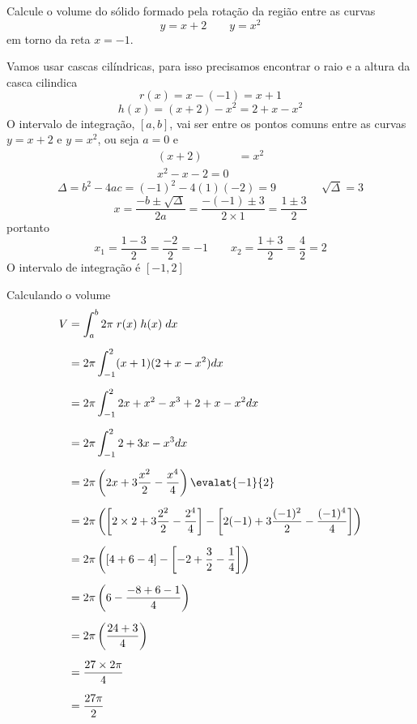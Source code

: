 \documentclass[a4paper,12pt,fleqn]{article}
\begin{document}

Calcule o volume do sólido formado pela rotação da região entre as curvas
\[
y = x+2 \qquad
y = x^2
\]
em torno da reta \(x=-1\).

\begin{answer}
  Vamos usar cascas cilíndricas, para isso precisamos encontrar o raio e a
  altura da casca cilindica
  \[
  r(x) = x - (-1) = x + 1
  \]
  \[
  h(x) = (x + 2) - x^2 = 2 + x - x^2
  \]
  O intervalo de integração, \([a, b]\), vai ser entre os pontos
  comuns entre as curvas \(y=x+2\) e \(y=x^2\),
  ou seja \(a=0\) e
  \begin{align*}
    (x + 2) & = x^2 \\
    x^2 - x - 2 = 0
  \end{align*}
  \[
  \Delta
  = b^2-4ac
  = (-1)^2 - 4(1)(-2)
  = 9
  \qquad\qquad
  \sqrt{\Delta} = 3
  \]
  \[
  x
  = \frac{-b\pm\sqrt{\Delta}}{2a}
  = \frac{-(-1)\pm 3}{2\times 1}
  = \frac{1\pm 3}{2}
  \]
  portanto
  \[
  x_1 = \frac{1-3}{2} = \frac{-2}{2} = -1
  \qquad
  x_2 = \frac{1+3}{2} = \frac{4}{2} = 2
  \]
  O intervalo de integração é \([-1, 2]\)

  \vspace{\baselineskip}
  Calculando o volume
  \begin{align*}
    V
    & = \int_a^b 2\pi \;r(x) \;h(x)\; dx  \\[2mm]
    & = 2\pi \int_{-1}^2 (x + 1) (2 + x - x^2) dx  \\[2mm]
    & = 2\pi \int_{-1}^2 2x + x^2 - x^3 + 2 + x - x^2  dx \\[2mm]
    & = 2\pi \int_{-1}^2 2 + 3x -x^3 dx \\[2mm]
    & = 2\pi \left(2x + 3\frac{x^2}{2} - \frac{x^4}{4}\right) \evalat{-1}{2} \\[2mm]
    & = 2\pi \left(
    \left[2\times 2 + 3\frac{2^2}{2} - \frac{2^4}{4}\right] -
    \left[2(-1) + 3\frac{(-1)^2}{2} - \frac{(-1)^4}{4}\right]
    \right) \\[2mm]
    & = 2\pi \left(
    \left[4 + 6 - 4\right] -
    \left[-2 + \frac{3}{2} - \frac{1}{4}\right]
    \right) \\[2mm]
    & = 2\pi \left( 6 - \frac{-8 + 6 - 1}{4} \right) \\[2mm]
    & = 2\pi \left( \frac{24+3}{4} \right) \\[2mm]
    & = \frac{27\times 2\pi}{4} \\[2mm]
    & = \frac{27\pi}{2}
  \end{align*}
  \clearpage
\end{answer}
\end{document}
